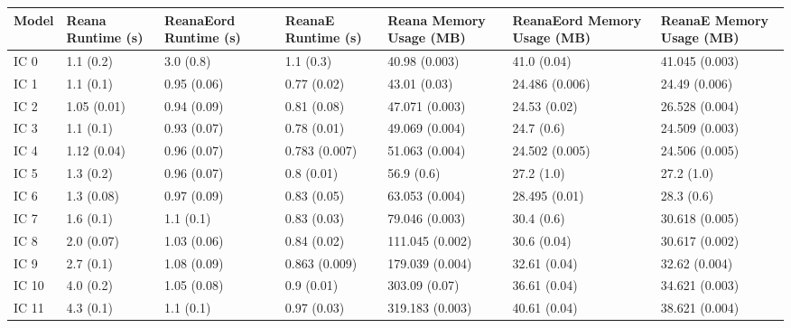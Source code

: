 \begin{tabular}{lllllll}
\toprule
Model & Reana Runtime (s) & ReanaEord Runtime (s) & ReanaE Runtime (s) & Reana Memory Usage (MB) & ReanaEord Memory Usage (MB) & ReanaE Memory Usage (MB) \\
\midrule
 IC 0 &         1.1 (0.2) &             3.0 (0.8) &          1.1 (0.3) &           40.98 (0.003) &                 41.0 (0.04) &           41.045 (0.003) \\
 IC 1 &         1.1 (0.1) &           0.95 (0.06) &        0.77 (0.02) &            43.01 (0.03) &              24.486 (0.006) &            24.49 (0.006) \\
 IC 2 &       1.05 (0.01) &           0.94 (0.09) &        0.81 (0.08) &          47.071 (0.003) &                24.53 (0.02) &           26.528 (0.004) \\
 IC 3 &         1.1 (0.1) &           0.93 (0.07) &        0.78 (0.01) &          49.069 (0.004) &                  24.7 (0.6) &           24.509 (0.003) \\
 IC 4 &       1.12 (0.04) &           0.96 (0.07) &      0.783 (0.007) &          51.063 (0.004) &              24.502 (0.005) &           24.506 (0.005) \\
 IC 5 &         1.3 (0.2) &           0.96 (0.07) &         0.8 (0.01) &              56.9 (0.6) &                  27.2 (1.0) &               27.2 (1.0) \\
 IC 6 &        1.3 (0.08) &           0.97 (0.09) &        0.83 (0.05) &          63.053 (0.004) &               28.495 (0.01) &               28.3 (0.6) \\
 IC 7 &         1.6 (0.1) &             1.1 (0.1) &        0.83 (0.03) &          79.046 (0.003) &                  30.4 (0.6) &           30.618 (0.005) \\
 IC 8 &        2.0 (0.07) &           1.03 (0.06) &        0.84 (0.02) &         111.045 (0.002) &                 30.6 (0.04) &           30.617 (0.002) \\
 IC 9 &         2.7 (0.1) &           1.08 (0.09) &      0.863 (0.009) &         179.039 (0.004) &                32.61 (0.04) &            32.62 (0.004) \\
IC 10 &         4.0 (0.2) &           1.05 (0.08) &         0.9 (0.01) &           303.09 (0.07) &                36.61 (0.04) &           34.621 (0.003) \\
IC 11 &         4.3 (0.1) &             1.1 (0.1) &        0.97 (0.03) &         319.183 (0.003) &                40.61 (0.04) &           38.621 (0.004) \\

\end{tabular}
